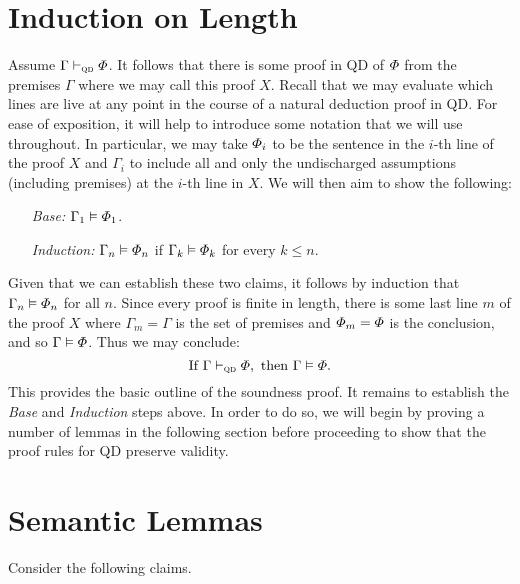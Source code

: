\section{Induction on Length}%
  \label{sec:InductionLength}

Assume $\Gamma \vdash_{\textsc{qd}} \varPhi$.
It follows that there is some proof in QD of $\varPhi$ from the premises $\Gamma$ where we may call this proof $X$. 
Recall that we may evaluate which lines are live at any point in the course of a natural deduction proof in QD.
For ease of exposition, it will help to introduce some notation that we will use throughout.
In particular, we may take $\varPhi_i$ to be the sentence in the $i$-th line of the proof $X$ and $\Gamma_i$ to include all and only the undischarged assumptions (including premises) at the $i$-th line in $X$.
We will then aim to show the following:

\begin{enumerate}[leftmargin=1.5in]
  \item[\it Base:] $\Gamma_1 \vDash \varPhi_1$.
  \item[\it Induction:] $\Gamma_{n} \vDash \varPhi_{n}$ if $\Gamma_k \vDash \varPhi_k$ for every $k\leq n$.
\end{enumerate}

Given that we can establish these two claims, it follows by induction that $\Gamma_n \vDash \varPhi_n$ for all $n$.
Since every proof is finite in length, there is some last line $m$ of the proof $X$ where $\Gamma_m=\Gamma$ is the set of premises and $\varPhi_m=\varPhi$ is the conclusion, and so $\Gamma \vDash \varPhi$. 
Thus we may conclude:
  $$\text{If } \Gamma \vdash_{\textsc{qd}} \varPhi, \text{ then } \Gamma \vDash \varPhi.$$
This provides the basic outline of the soundness proof.
It remains to establish the \textit{Base} and \textit{Induction} steps above.
In order to do so, we will begin by proving a number of lemmas in the following section before proceeding to show that the proof rules for QD preserve validity.



\section{Semantic Lemmas}%
  \label{sec:CL}

Consider the following claims.

\label{box:Lemma1}

